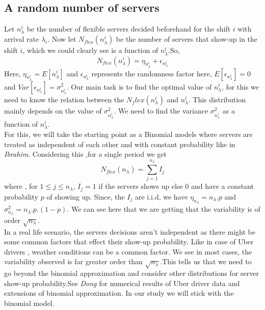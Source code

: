 \subsection{A random number of servers}
Let $n_\lambda^{i}$ be the number of flexible servers decided beforehand for the shift $i$ with arrival rate $\lambda_i$. Now let $N_{flex}(n_\lambda^{i})$ be the number of servers that show-up in the shift $i$, which we could clearly see is a function of $n_\lambda^{i}$.So,
$$N_{flex}(n_\lambda^{i})= \eta_{n_\lambda^{i}}+ \epsilon_{n_\lambda^{i}}$$
Here, $\eta_{n_\lambda^{i}}=E[n_\lambda^{i}]$ and $\epsilon_{n_\lambda^{i}}$ represents the randomness factor here, $E[\epsilon_{n_\lambda^{i}}]=0$ and $Var[\epsilon_{n_\lambda^{i}}]=\sigma_{n_\lambda^{i}}^{2}$. Our main task is to find the optimal value of $n_\lambda^{i}$, for this we need to know the relation between the $N_flex(n_\lambda^{i})$ and $n_\lambda^{i}$. This distribution mainly depends on the value of $\sigma_{n_\lambda^{i}}^{2}$. We need to find the variance $\sigma_{n_\lambda^{i}}^{2}$ as a function of $n_\lambda^{i}$.
\\ For this, we will take the starting point as a Binomial models where servers are treated as independent of each other and with constant probability like in \textit{Ibrahim}\cite{ibrahim}.
Considering this ,for a single period we get
$$N_{flex}(n_{\lambda})=\sum_{j=1}^{n_{\lambda}}{I_j}$$ where , for $1 \leq j \leq n_{\lambda}$, $I_j=1$ if the servers shows up else $0$ and have a constant probability $p$ of showing up. Since, the $I_j$ are i.i.d, we have $\eta_{n_\lambda}=n_{\lambda}.p$ and $\sigma_{n_\lambda}^{2}= n_{\lambda}.p.(1-p)$. We can see here that we are getting that the variability is of order $\sqrt{n_\lambda}$. 
\\ In a real life scenario, the servers decisions aren't independent as there might be some common factors that effect their show-up probability. Like in case of Uber drivers , weather conditions can be a common factor. We see in most cases, the variability observed is far greater order than $\sqrt{n_\lambda}$.This tells us that we need to go beyond the binomial approximation and consider other distributions for server show-up probability.See \textit{Dong} \cite{dong} for numerical results of Uber driver data and extensions of binomial approximation. In our study we will stick with the binomial model.
